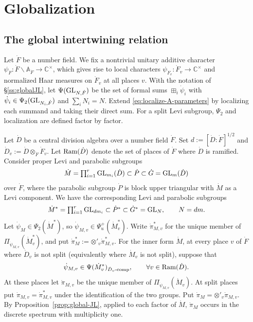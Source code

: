 \documentclass[11pt,reqno]{amsart}
\theoremstyle{plain}
\theoremstyle{definition}
\newcommand{\A}{\mathbb{A}}
\newcommand{\C}{\mathbb{C}}
\newcommand{\GL}{\tu{GL}}
\newcommand{\tu}{\textup}
\numberwithin{equation}{subsection}
\begin{document}
\section{Globalization}
\label{s:globalization}

\subsection{The global intertwining relation}
 
Let $\dot F$ be a number field. We fix a nontrivial unitary additive character $\psi_{\dot F}:\dot F\backslash \A_{\dot F}\to \C^\times$, which gives rise to local characters $\psi_{\dot F_v}:\dot F_v\to \C^\times$ and normalized Haar measures on $\dot F_v$ at all places $v$.
With the notation of \S\ref{ss:globalJL}, let $\Psi(\GL_{N,\dot F})$
be the set of formal sums $\boxplus_i\dot\psi_i$ with
$\dot\psi_i\in\Psi_2(\GL_{N_i,\dot F})$ and $\sum_iN_i=N$.
Extend \eqref{eq:localize-A-parameters} by localizing each summand and
taking their direct sum. For a split Levi subgroup, $\Psi_2$ and
localization are defined factor by factor.

Let $\dot D$ be a central division algebra over a number field $\dot F$. Set $d:=[\dot D:\dot F]^{1/2}$ and $\dot D_v:=\dot D\otimes_{\dot F}\dot F_v$. Let $\tu{Ram}(\dot D)$ denote the set of places of $\dot F$ where $\dot D$ is ramified.
Consider proper Levi and parabolic subgroups 
\[
\dot M=\textstyle\prod_{i=1}^r  \GL_{m_i}(\dot D)\subset \dot P\subset \dot G=\GL_m(\dot D)
\]
over $\dot F$, where the parabolic subgroup $\dot P$ is block upper triangular with $\dot M$ as a Levi component. We have the corresponding Levi and parabolic subgroups 
\[
\dot M^*=\textstyle\prod_{i=1}^r  \GL_{d m_i} \subset \dot P^*\subset  \dot G^*=\GL_N,\qquad  N=dm.
\]
Let $\dot \psi_M\in \Psi_2(\dot M^*)$, so $\dot\psi_{M,v}\in \Psi^+_u(\dot M^*_v)$. Write $\dot \pi_{M,v}^*$ for the unique member of $\Pi_{\dot \psi_{M,v}}(\dot M_v^*)$, and put $\dot \pi^*_M:=\otimes'_v \dot \pi^*_{M,v}$.
For the inner form $\dot M$, at every place $v$ of $\dot F$ where $\dot D_v$ is not split (equivalently where $\dot M_v$ is not split), suppose that 
\begin{equation}\label{eq:packet-nonempty-at-v}
    \dot \psi_{M,v}\in \Psi(\dot M^*_v)_{\dot D_v\tu{-comp}},\qquad \forall v\in \tu{Ram}(\dot D). 
\end{equation}
At these places let $\dot\pi_{M,v}$ be the unique member of
$\Pi_{\dot\psi_{M,v}}(\dot M_v)$. At split places put
$\dot\pi_{M,v}=\dot\pi^*_{M,v}$ under the identification of the
two groups. Put $\dot\pi_M=\otimes'_v\dot\pi_{M,v}$.
By Proposition~\ref{prop:global-JL}, applied to each factor of $\dot M$,
$\dot\pi_M$ occurs in the discrete spectrum with multiplicity one.
\end{document}
